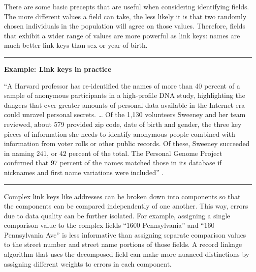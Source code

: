 \documentclass[]{krantz}
\begin{document}
There are some basic precepts that are useful when considering
identifying fields. The more different values a field can take, the less
likely it is that two randomly chosen individuals in the population will
agree on those values. Therefore, fields that exhibit a wider range of
values are more powerful as link keys: names are much better link keys
than sex or year of birth.

\begin{center}\rule{0.5\linewidth}{\linethickness}\end{center}

\textbf{Example: Link keys in practice}

``A Harvard professor has re-identified the names of more than 40
percent of a sample of anonymous participants in a high-profile DNA
study, highlighting the dangers that ever greater amounts of personal
data available in the Internet era could unravel personal secrets.
\ldots{} Of the 1,130 volunteers Sweeney and her team reviewed, about
579 provided zip code, date of birth and gender, the three key pieces of
information she needs to identify anonymous people combined with
information from voter rolls or other public records. Of these, Sweeney
succeeded in naming 241, or 42 percent of the total. The Personal Genome
Project confirmed that 97 percent of the names matched those in its
database if nicknames and first name variations were included''
\citep{forbesharvard}.

\begin{center}\rule{0.5\linewidth}{\linethickness}\end{center}

Complex link keys like addresses can be broken down into components so
that the components can be compared independently of one another. This
way, errors due to data quality can be further isolated. For example,
assigning a single comparison value to the complex fields ``1600
Pennsylvania'' and ``160 Pennsylvania Ave'' is less informative than
assigning separate comparison values to the street number and street
name portions of those fields. A record linkage algorithm that uses the
decomposed field can make more nuanced distinctions by assigning
different weights to errors in each component.
\end{document}
